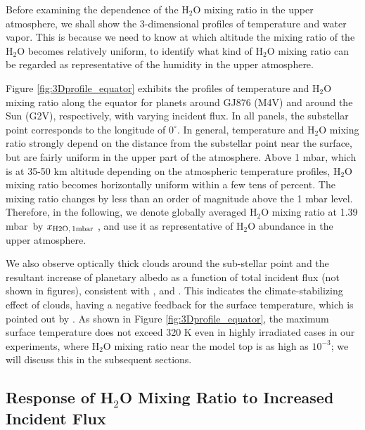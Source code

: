 \documentclass[11pt,numberedappendix,twocolappendix,]{emulateapj}
\def\water{H$_2$O }
\def\xwater{$x_{\rm H2O,\,1mbar}$ }
\def\preslevel{1.39 mbar\ }
\begin{document}
Before examining the dependence of the \water mixing ratio in the upper atmosphere, we shall show the 3-dimensional profiles of temperature and water vapor. 
This is because we need to know at which altitude the mixing ratio of the \water becomes relatively uniform, to identify what kind of \water mixing ratio can be regarded as representative of the humidity in the upper atmosphere. 

Figure \ref{fig:3Dprofile_equator} exhibits the profiles of temperature and \water mixing ratio along the equator for planets around GJ876 (M4V) and around the Sun (G2V), respectively, with varying incident flux. 
In all panels, the substellar point corresponds to the longitude of $0^{\circ }$. 
In general, temperature and \water mixing ratio strongly depend on the distance from the substellar point near the surface, but are fairly uniform in the upper part of the atmosphere. 
Above 1 mbar, which is at 35-50 km altitude depending on the atmospheric temperature profiles, \water mixing ratio becomes horizontally uniform within a few tens of percent. 
The mixing ratio changes by less than an order of magnitude above the 1 mbar level. 
Therefore, in the following, we denote globally averaged \water mixing ratio at \preslevel  by \xwater, and use it as representative of \water abundance in the upper atmosphere. 



We also observe optically thick clouds around the sub-stellar point and the resultant increase of planetary albedo as a function of total incident flux (not shown in figures), consistent with \citet{Yang2013,Yang2014}, \citet{Kopparapu2016} and \citet{Way2016}. 
This indicates the climate-stabilizing effect of clouds, having a negative feedback for the surface temperature, which is pointed out by \citet{Yang2013}. 
As shown in Figure \ref{fig:3Dprofile_equator}, the maximum surface temperature does not exceed 320 K even in highly irradiated cases in our experiments, where \water mixing ratio near the model top is as high as $10^{-3}$; we will discuss this in the subsequent sections. 


\subsection{Response of \water Mixing Ratio to Increased Incident Flux}
\label{ss:result_H2Omixingratio}
\end{document}
